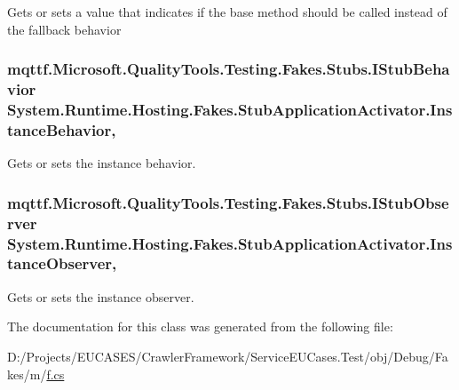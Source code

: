 Gets or sets a value that indicates if the base method should be called instead of the fallback behavior

\hypertarget{class_system_1_1_runtime_1_1_hosting_1_1_fakes_1_1_stub_application_activator_a509bf7b65e02959cab93c5d4c3a11d31}{
\subsubsection[{Instance\-Behavior}]{\setlength{\rightskip}{0pt plus 5cm}mqttf.\-Microsoft.\-Quality\-Tools.\-Testing.\-Fakes.\-Stubs.\-I\-Stub\-Behavior System.\-Runtime.\-Hosting.\-Fakes.\-Stub\-Application\-Activator.\-Instance\-Behavior\hspace{0.3cm}{\ttfamily [get]}, {\ttfamily [set]}}}\label{class_system_1_1_runtime_1_1_hosting_1_1_fakes_1_1_stub_application_activator_a509bf7b65e02959cab93c5d4c3a11d31}


Gets or sets the instance behavior.

\hypertarget{class_system_1_1_runtime_1_1_hosting_1_1_fakes_1_1_stub_application_activator_a4bfbac99875040de24f1d60513a162d3}{
\subsubsection[{Instance\-Observer}]{\setlength{\rightskip}{0pt plus 5cm}mqttf.\-Microsoft.\-Quality\-Tools.\-Testing.\-Fakes.\-Stubs.\-I\-Stub\-Observer System.\-Runtime.\-Hosting.\-Fakes.\-Stub\-Application\-Activator.\-Instance\-Observer\hspace{0.3cm}{\ttfamily [get]}, {\ttfamily [set]}}}\label{class_system_1_1_runtime_1_1_hosting_1_1_fakes_1_1_stub_application_activator_a4bfbac99875040de24f1d60513a162d3}


Gets or sets the instance observer.



The documentation for this class was generated from the following file\-:\begin{DoxyCompactItemize}
\item 
D\-:/\-Projects/\-E\-U\-C\-A\-S\-E\-S/\-Crawler\-Framework/\-Service\-E\-U\-Cases.\-Test/obj/\-Debug/\-Fakes/m/\hyperlink{m_2f_8cs}{f.\-cs}\end{DoxyCompactItemize}
